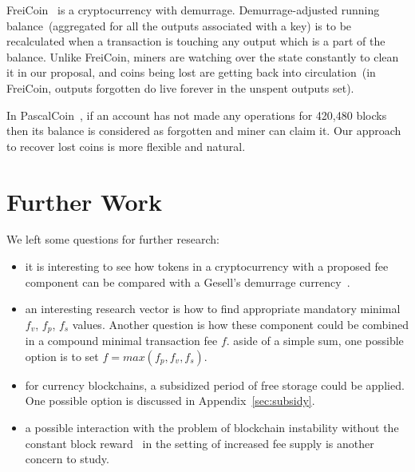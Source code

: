\documentclass[]{llncs}   %
\begin{document}
FreiCoin~\cite{freicoin} is a cryptocurrency with demurrage. Demurrage-adjusted running balance~(aggregated for all the outputs associated with a key) is to be recalculated when a transaction is touching any output which is a part of the balance. Unlike FreiCoin, miners are watching over the state constantly to clean it in our proposal, and coins being lost are getting back into circulation~(in FreiCoin, outputs forgotten do live forever in the unspent outputs set).

In PascalCoin~\cite{pascalCoin}, if an account has not made any operations for 420,480 blocks then its balance is considered as forgotten and miner can claim it. Our approach to recover lost coins is more flexible and natural. %

\section{Further Work}
\label{sec:further-work}

We left some questions for further research:

\begin{itemize}
  \item{}it is interesting to see how tokens in a cryptocurrency with a proposed fee component can be compared with a Gesell's demurrage currency~\cite{gesell1958natural}.
  \item{}an interesting research vector is how to find appropriate mandatory minimal $f_v$, $f_p$, $f_s$ values. Another question is how these component could be combined in a compound minimal transaction fee $f$. aside of a simple sum, one possible option is to set $f = max(f_p, f_v, f_s)$.
  \item{}for currency blockchains, a subsidized period of free storage could be applied. One possible option is discussed in Appendix~\ref{sec:subsidy}.
  \item{}a possible interaction with the problem of blockchain instability without the constant block reward~\cite{carlsten2016instability} in the setting of increased fee supply is another concern to study.
\end{itemize}




\appendix
\end{document}
